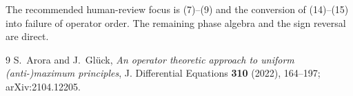 \documentclass[11pt]{article}
\theoremstyle{remark}
\begin{document}
The recommended human-review focus is (7)--(9) and the conversion of
(14)--(15) into failure of operator order.  The remaining phase algebra and
the sign reversal are direct.

\begin{thebibliography}{9}
S.~Arora and J.~Glück,
\emph{An operator theoretic approach to uniform (anti-)maximum principles},
J. Differential Equations \textbf{310} (2022), 164--197;
arXiv:2104.12205.
\end{thebibliography}
\end{document}
